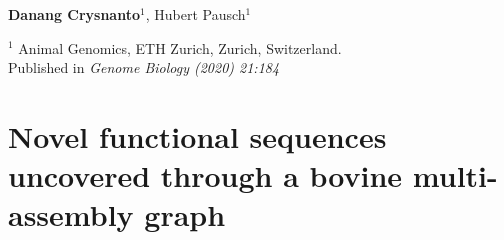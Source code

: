 \documentclass[11 pt, a4paper, notitlepage, twoside]{report}
\begin{document}
\subsection*{}
\normalsize

{
\vspace{2em}
\setlength\parindent{0pt}
\large

\textbf{Danang Crysnanto}$^{1}$, Hubert Pausch$^{1}$ \\

\vspace{0.5em}

$^1$ Animal Genomics, ETH Zurich, Zurich, Switzerland. \\

\bigskip
Published in \emph{Genome Biology (2020) 21:184}

\bigskip

\begin{center}\end{center}

}



\iftwoside
\cleardoublepage
\newpage
\fi

\chapter[A pangenome established from six assemblies]{\LARGE{Novel functional sequences uncovered through a bovine multi-assembly graph}}
\label{chap:multigraph}

\subsection*{}
\normalsize
\end{document}

